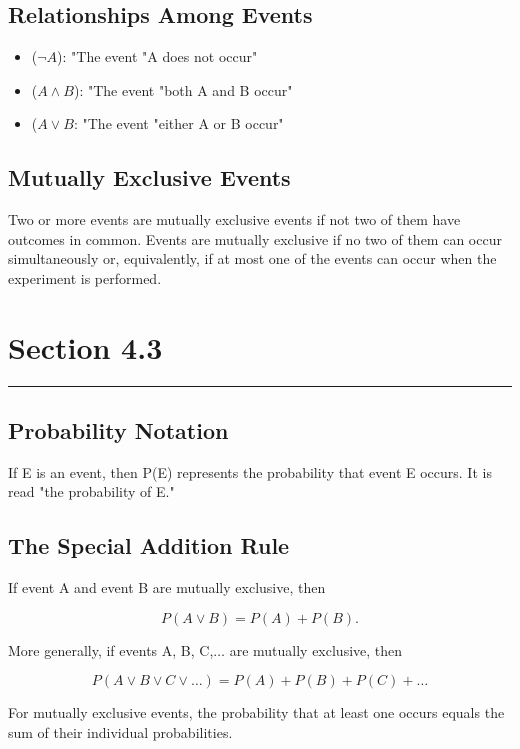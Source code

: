 \documentclass[12pt]{article}
\begin{document}
        \subsection*{Relationships Among Events}
            \begin{itemize}
                \item (\(\neg A\)): "The event "A does not occur"
                \item (\(A \wedge B\)): "The event "both A and B occur"
                \item (\(A \vee B\): "The event "either A or B occur"
            \end{itemize}
        \subsection*{Mutually Exclusive Events}
               Two or more events are mutually exclusive events if not two of them have outcomes in
               common.
               Events are mutually exclusive if no two of them can occur simultaneously or,
               equivalently, if at most one of the events can occur when the experiment is performed.
    \section*{Section 4.3}
    \noindent\rule{\textwidth}{0.4pt}
        \subsection*{Probability Notation}
            If E is an event, then P(E) represents the probability that event E occurs. It is read
            "the probability of E."
        \subsection*{The Special Addition Rule}
            If event A and event B are mutually exclusive, then
            \begin{center}
                \[
                    P(A \vee B) = P(A)  + P(B).  
                \]
            \end{center}
            More generally, if events A, B, C,$\dots$ are mutually exclusive, then
            \begin{center}
                \[
                    P(A \vee B \vee C \vee \dots) = P(A) + P(B) + P(C) + \dots    
                \]                
            \end{center}
            For mutually exclusive events, the probability that at least one occurs equals the sum
            of their individual probabilities.
\end{document}
